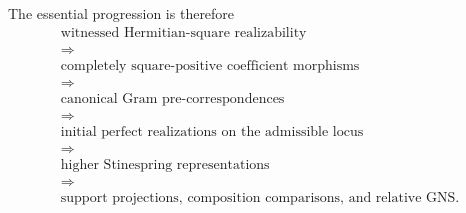The essential progression is therefore
\[
  \boxed{
  \begin{gathered}
    \text{witnessed Hermitian-square realizability}
    \\
    \Longrightarrow
    \\
    \text{completely square-positive coefficient morphisms}
    \\
    \Longrightarrow
    \\
    \text{canonical Gram pre-correspondences}
    \\
    \Longrightarrow
    \\
    \text{initial perfect realizations on the admissible locus}
    \\
    \Longrightarrow
    \\
    \text{higher Stinespring representations}
    \\
    \Longrightarrow
    \\
    \text{support projections, composition comparisons, and relative GNS.}
  \end{gathered}
  }
\]